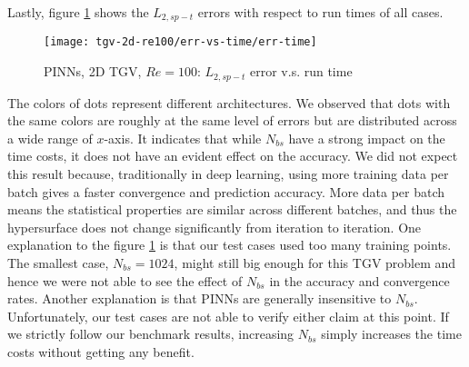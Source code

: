 Lastly, figure \ref{fig:tgv2d-re100-err-vs-time} shows the $L_{2,sp-t}$ errors with respect to run times of all cases.
\begin{figure}[hbt!]
    \centering%
    \texttt{[image: tgv-2d-re100/err-vs-time/err-time]}
    \caption[%
        PINNs, 2D TGV, $Re=100$: $L_{2,sp-t}$ error v.s. run time%
    ]{%
        PINNs, 2D TGV, $Re=100$: $L_{2,sp-t}$ error v.s. run time%
    }
    \label{fig:tgv2d-re100-err-vs-time}
\end{figure}
The colors of dots represent different architectures.
We observed that dots with the same colors are roughly at the same level of errors but are distributed across a wide range of $x$-axis.
It indicates that while $N_{bs}$ have a strong impact on the time costs, it does not have an evident effect on the accuracy.
We did not expect this result because, traditionally in deep learning, using more training data per batch gives a faster convergence and prediction accuracy.
More data per batch means the statistical properties are similar across different batches, and thus the hypersurface does not change significantly from iteration to iteration.
One explanation to the figure \ref{fig:tgv2d-re100-err-vs-time} is that our test cases used too many training points.
The smallest case, $N_{bs}=1024$, might still big enough for this TGV problem and hence we were not able to see the effect of $N_{bs}$ in the accuracy and convergence rates.
Another explanation is that PINNs are generally insensitive to $N_{bs}$. 
Unfortunately, our test cases are not able to verify either claim at this point.
If we strictly follow our benchmark results, increasing $N_{bs}$ simply increases the time costs without getting any benefit.
